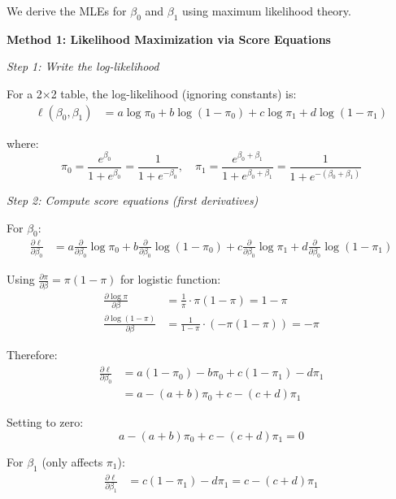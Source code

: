 \documentclass[12pt]{article}
\begin{document}
\begin{solution}
We derive the MLEs for $\beta_0$ and $\beta_1$ using maximum likelihood theory.

\textbf{Method 1: Likelihood Maximization via Score Equations}

\textit{Step 1: Write the log-likelihood}

For a 2$\times$2 table, the log-likelihood (ignoring constants) is:
\begin{align*}
\ell(\beta_0, \beta_1) &= a\log\pi_0 + b\log(1-\pi_0) + c\log\pi_1 + d\log(1-\pi_1)
\end{align*}

where:
\[
\pi_0 = \frac{e^{\beta_0}}{1+e^{\beta_0}} = \frac{1}{1+e^{-\beta_0}}, \quad \pi_1 = \frac{e^{\beta_0+\beta_1}}{1+e^{\beta_0+\beta_1}} = \frac{1}{1+e^{-(\beta_0+\beta_1)}}
\]

\textit{Step 2: Compute score equations (first derivatives)}

For $\beta_0$:
\begin{align*}
\frac{\partial \ell}{\partial \beta_0} &= a\frac{\partial}{\partial\beta_0}\log\pi_0 + b\frac{\partial}{\partial\beta_0}\log(1-\pi_0) + c\frac{\partial}{\partial\beta_0}\log\pi_1 + d\frac{\partial}{\partial\beta_0}\log(1-\pi_1)
\end{align*}

Using $\frac{\partial\pi}{\partial\beta} = \pi(1-\pi)$ for logistic function:
\begin{align*}
\frac{\partial \log\pi}{\partial\beta} &= \frac{1}{\pi}\cdot\pi(1-\pi) = 1-\pi \\
\frac{\partial \log(1-\pi)}{\partial\beta} &= \frac{1}{1-\pi}\cdot(-\pi(1-\pi)) = -\pi
\end{align*}

Therefore:
\begin{align*}
\frac{\partial \ell}{\partial \beta_0} &= a(1-\pi_0) - b\pi_0 + c(1-\pi_1) - d\pi_1 \\
&= a - (a+b)\pi_0 + c - (c+d)\pi_1
\end{align*}

Setting to zero:
\begin{equation}
a - (a+b)\pi_0 + c - (c+d)\pi_1 = 0
\end{equation}

For $\beta_1$ (only affects $\pi_1$):
\begin{align*}
\frac{\partial \ell}{\partial \beta_1} &= c(1-\pi_1) - d\pi_1 = c - (c+d)\pi_1
\end{align*}


\end{solution}
\end{document}
